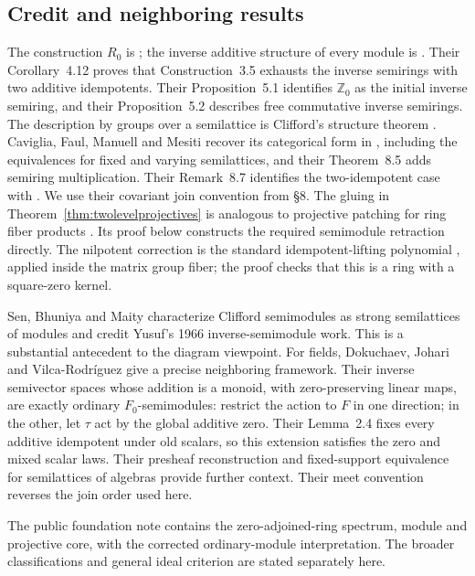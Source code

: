 \documentclass[11pt]{amsart}
\newcommand{\Z}{\mathbb Z}
\theoremstyle{definition}
\theoremstyle{remark}
\begin{document}
\subsection*{Credit and neighboring results}
The construction $R_0$ is \cite[Definition~3.6]{FGJM}; the inverse additive structure of every module is \cite[Proposition~6.1]{FGJM}. Their Corollary~4.12 proves that Construction~3.5 exhausts the inverse semirings with two additive idempotents. Their Proposition~5.1 identifies $\Z_0$ as the initial inverse semiring, and their Proposition~5.2 describes free commutative inverse semirings. The description by groups over a semilattice is Clifford's structure theorem \cite{Clifford}. Caviglia, Faul, Manuell and Mesiti recover its categorical form in \cite[\S\S4--5]{CFMM}, including the equivalences for fixed and varying semilattices, and their Theorem~8.5 adds semiring multiplication. Their Remark~8.7 identifies the two-idempotent case with \cite[Construction~3.5]{FGJM}. We use their covariant join convention from \S8. The gluing in Theorem~\ref{thm:twolevelprojectives} is analogous to projective patching for ring fiber products \cite[Lemma~15.6.9, Tag~0D2G]{Stacks}. Its proof below constructs the required semimodule retraction directly. The nilpotent correction is the standard idempotent-lifting polynomial \cite[Lemma~10.32.7, Tag~05BU]{Stacks}, applied inside the matrix group fiber; the proof checks that this is a ring with a square-zero kernel.

Sen, Bhuniya and Maity \cite[Abstract]{SBM} characterize Clifford semimodules as strong semilattices of modules and credit Yusuf's 1966 inverse-semimodule work. This is a substantial antecedent to the diagram viewpoint. For fields, Dokuchaev, Johari and Vilca-Rodr\'iguez \cite[Definitions~2.2--2.3 and Lemma~2.4, pp.~1641--1643]{DJV} give a precise neighboring framework. Their inverse semivector spaces whose addition is a monoid, with zero-preserving linear maps, are exactly ordinary $F_0$-semimodules: restrict the action to $F$ in one direction; in the other, let $\tau$ act by the global additive zero. Their Lemma~2.4 fixes every additive idempotent under old scalars, so this extension satisfies the zero and mixed scalar laws. Their presheaf reconstruction and fixed-support equivalence for semilattices of algebras \cite[Propositions~3.10 and~3.12, pp.~1656--1657]{DJV} provide further context. Their meet convention reverses the join order used here.

The public foundation note \cite[Theorems~1--3 and Remark~5.4]{FoundationPublic} contains the zero-adjoined-ring spectrum, module and projective core, with the corrected ordinary-module interpretation. The broader classifications and general ideal criterion are stated separately here.
\end{document}
